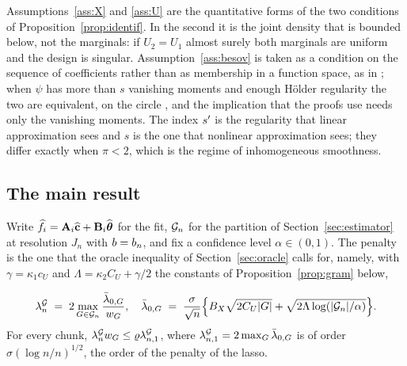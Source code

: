 Assumptions~\ref{ass:X} and \ref{ass:U} are the quantitative forms of the two
conditions of Proposition~\ref{prop:identif}. In the second it is the joint
density that is bounded below, not the marginals: if $U_2 = U_1$ almost surely
both marginals are uniform and the design is singular.
Assumption~\ref{ass:besov} is taken as a condition on the sequence of
coefficients rather than as membership in a function space, as in
\citet{Klopp-Pensky-2015}; when $\psi$ has more than $s$ vanishing moments and
enough Hölder regularity the two are equivalent, on the circle
\citep[Section 3.6]{Cohen-2003}, and the implication that the proofs use needs
only the vanishing moments. The index $s'$ is the regularity that linear
approximation sees and $s$ is the one that nonlinear approximation sees; they differ
exactly when $\pi < 2$, which is the regime of inhomogeneous smoothness.

\subsection{The main result}
\label{sec:main}

Write $\widehat{f}_i = \mathbf{A}_i\widehat{\mathbf{c}} + \mathbf{B}_i\widehat{\boldsymbol{\theta}}$ for the fit, $\mathcal{G}_{n}$ for the
partition of Section~\ref{sec:estimator} at resolution $J_n$ with $b = b_{n}$,
and fix a confidence
level $\alpha \in (0,1)$. The penalty is the one that the oracle inequality of
Section~\ref{sec:oracle} calls for, namely, with $\gamma = \kappa_1c_U$
and $\Lambda = \kappa_2C_U + \gamma/2$ the constants of
Proposition~\ref{prop:gram} below,


\begin{equation}
  \label{eq:lambda}
  \lambda^{\mathcal{G}}_{n} \;=\; 2\max_{G\in\mathcal{G}_{n}}\frac{\bar{\lambda}_{0,G}}{w_{G}},
  \quad
  \bar{\lambda}_{0,G} \;=\; \frac{\sigma}{\sqrt{n}}\Bigl\{B_X\sqrt{2C_U|G|}
  + \sqrt{2\Lambda\log(|\mathcal{G}_{n}|/\alpha)}\Bigr\} .
\end{equation}
For every chunk, $\lambda^{\mathcal{G}}_{n} w_{G} \le \varrho\lambda^{\mathcal{G}}_{n,1}$, where
$\lambda^{\mathcal{G}}_{n,1} = 2\max_{G}\bar{\lambda}_{0,G}$ is of order $\sigma(\log n/n)^{1/2}$, the
order of the penalty of the lasso.



